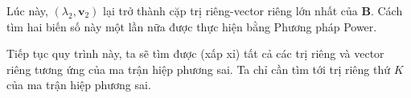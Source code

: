 	  Lúc này, $(\lambda_2, \mathbf{v}_2)$ lại trở thành cặp trị riêng-vector riêng lớn nhất của $\mathbf{B}$. Cách tìm hai biến số này một lần nữa được thực hiện bằng Phương pháp Power.
	 
	 Tiếp tục quy trình này, ta sẽ tìm được (xấp xỉ) tất cả các trị riêng và vector riêng tương ứng của ma trận hiệp phương sai. Ta chỉ cần tìm tới trị riêng thứ $K$ của ma trận hiệp phương sai. 
	 
	 
	 
